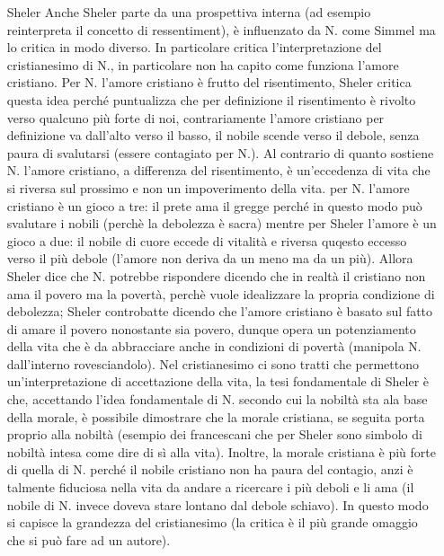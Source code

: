 \documentclass[10pt,a4paper]{article}
\begin{document}
\begin{itemize}
\item[Sheler] Anche Sheler parte da una prospettiva interna (ad esempio reinterpreta il concetto di ressentiment), è influenzato da N. come Simmel ma lo critica in modo diverso. In particolare critica l'interpretazione del cristianesimo di N., in particolare non ha capito come funziona l'amore cristiano. Per N. l'amore cristiano è frutto del risentimento, Sheler critica questa idea perché puntualizza che per definizione il risentimento è rivolto verso qualcuno più forte di noi, contrariamente l'amore cristiano per definizione va dall'alto verso il basso, il nobile scende verso il debole, senza paura di svalutarsi (essere contagiato per N.). Al contrario di quanto sostiene N. l'amore cristiano, a differenza del risentimento, è un'eccedenza di vita che si riversa sul prossimo e non un impoverimento della vita. per N. l'amore cristiano è un gioco a tre: il prete ama il gregge perché in questo modo può svalutare i nobili (perchè la debolezza è sacra) mentre per Sheler l'amore è un gioco a due: il nobile di cuore eccede di vitalità e riversa quqesto eccesso verso il più debole (l'amore non deriva da un meno ma da un più). Allora Sheler dice che N. potrebbe rispondere dicendo che in realtà il cristiano non ama il povero ma la povertà, perchè vuole idealizzare la propria condizione di debolezza; Sheler controbatte dicendo che l'amore cristiano è basato sul fatto di amare il povero nonostante sia povero, dunque opera un potenziamento della vita che è da abbracciare anche in condizioni di povertà (manipola N. dall'interno rovesciandolo). Nel cristianesimo ci sono tratti che permettono un'interpretazione di accettazione della vita, la tesi fondamentale di Sheler è che, accettando l'idea fondamentale di N. secondo cui la nobiltà sta ala base della morale, è possibile dimostrare che la morale cristiana, se seguita porta proprio alla nobiltà (esempio dei francescani che per Sheler sono simbolo di nobiltà intesa come dire di sì alla vita). Inoltre, la morale cristiana è più forte di quella di N. perché il nobile cristiano non ha paura del contagio, anzi è talmente fiduciosa nella vita da andare a ricercare i più deboli e li ama (il nobile di N. invece doveva stare lontano dal debole schiavo). In questo modo si capisce la grandezza del cristianesimo (la critica è il più grande omaggio che si può fare ad un autore).

\end{itemize}
\end{document}
